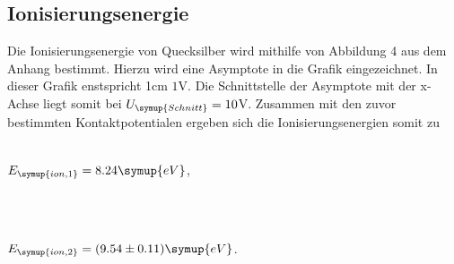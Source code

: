     


    \subsection{Ionisierungsenergie} 
    Die Ionisierungsenergie von Quecksilber wird mithilfe von Abbildung 4 aus dem Anhang bestimmt. 
    Hierzu wird eine Asymptote in die Grafik eingezeichnet. In dieser Grafik enstspricht 1cm $1$V.
    Die Schnittstelle der Asymptote mit der x-Achse liegt somit bei $U_{\symup{Schnitt}} = 10$V.
    Zusammen mit den zuvor bestimmten Kontaktpotentialen
    ergeben sich die Ionisierungsenergien somit zu
    \\ \\
    \centerline{$E_{\symup{ion, 1}} = 8.24 \symup{eV}$,}
    \\ \\
    \centerline{$E_{\symup{ion, 2}} = (9.54 \pm 0.11) \symup{eV}$.}